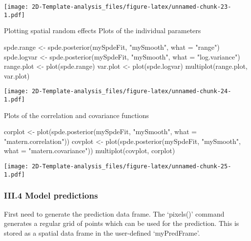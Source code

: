 \documentclass[
]{article}
\newenvironment{Shaded}{\begin{snugshade}}{\end{snugshade}}
\newcommand{\AttributeTok}[1]{\textcolor[rgb]{0.77,0.63,0.00}{#1}}
\newcommand{\FunctionTok}[1]{\textcolor[rgb]{0.00,0.00,0.00}{#1}}
\newcommand{\NormalTok}[1]{#1}
\newcommand{\OtherTok}[1]{\textcolor[rgb]{0.56,0.35,0.01}{#1}}
\newcommand{\StringTok}[1]{\textcolor[rgb]{0.31,0.60,0.02}{#1}}
\begin{document}
\texttt{[image: 2D-Template-analysis\_files/figure-latex/unnamed-chunk-23-1.pdf]}

Plotting spatial random effects Plots of the individual parameters

\begin{Shaded}
\begin{Highlighting}[]
\NormalTok{spde.range }\OtherTok{\textless{}{-}} \FunctionTok{spde.posterior}\NormalTok{(mySpdeFit, }\StringTok{"mySmooth"}\NormalTok{, }\AttributeTok{what =} \StringTok{"range"}\NormalTok{)}
\NormalTok{spde.logvar }\OtherTok{\textless{}{-}} \FunctionTok{spde.posterior}\NormalTok{(mySpdeFit, }\StringTok{"mySmooth"}\NormalTok{, }\AttributeTok{what =} \StringTok{"log.variance"}\NormalTok{)}
\NormalTok{range.plot }\OtherTok{\textless{}{-}} \FunctionTok{plot}\NormalTok{(spde.range)}
\NormalTok{var.plot }\OtherTok{\textless{}{-}} \FunctionTok{plot}\NormalTok{(spde.logvar)}
\FunctionTok{multiplot}\NormalTok{(range.plot, var.plot)}
\end{Highlighting}
\end{Shaded}

\texttt{[image: 2D-Template-analysis\_files/figure-latex/unnamed-chunk-24-1.pdf]}

Plots of the correlation and covariance functions

\begin{Shaded}
\begin{Highlighting}[]
\NormalTok{corplot }\OtherTok{\textless{}{-}} \FunctionTok{plot}\NormalTok{(}\FunctionTok{spde.posterior}\NormalTok{(mySpdeFit, }\StringTok{"mySmooth"}\NormalTok{, }\AttributeTok{what =} \StringTok{"matern.correlation"}\NormalTok{))}
\NormalTok{covplot }\OtherTok{\textless{}{-}} \FunctionTok{plot}\NormalTok{(}\FunctionTok{spde.posterior}\NormalTok{(mySpdeFit, }\StringTok{"mySmooth"}\NormalTok{, }\AttributeTok{what =} \StringTok{"matern.covariance"}\NormalTok{))}
\FunctionTok{multiplot}\NormalTok{(covplot, corplot)}
\end{Highlighting}
\end{Shaded}

\texttt{[image: 2D-Template-analysis\_files/figure-latex/unnamed-chunk-25-1.pdf]}

\hypertarget{iii.4-model-predictions}{%
\subsubsection{III.4 Model predictions}\label{iii.4-model-predictions}}

First need to generate the prediction data frame. The `pixels()' command
generates a regular grid of points which can be used for the prediction.
This is stored as a spatial data frame in the user-defined
`myPredFrame'.
\end{document}
